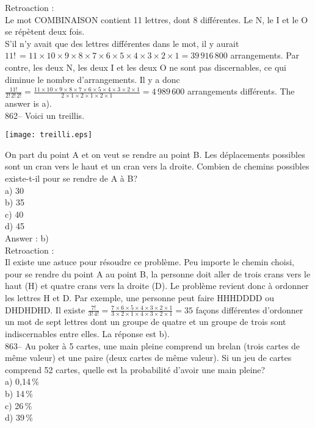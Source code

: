 ﻿\documentclass[letterpaper, 12pt]{article}
\begin{document}
Retroaction : \\
Le mot COMBINAISON contient 11 lettres, dont 8 diff\'erentes.  Le N, le I et
le O se r\'ep\`etent deux fois.\\
S'il n'y avait que des lettres diff\'erentes dans le mot, il y aurait
$11!\,=11\times10\times9\times8\times7\times6\times5\times4\times3\times2\times1=39\,916\,800$
arrangements.  Par contre, les deux N, les deux I et les deux O ne sont pas
discernables, ce qui diminue le nombre d'arrangements.  Il y a donc
$\frac{11!}{2!\,2!\,2!}=\frac{11\times10\times9\times8\times7\times6\times5\times4\times3\times2\times1}{2\times1\times2\times1\times2\times1}=4\,989\,600$
arrangements diff\'erents.  The answer is a).\\

862-- Voici un treillis.    \begin{center}
    \texttt{[image: treilli.eps]}
    \end{center}
On part du point A et on veut se rendre au point B.  Les d\'eplacements
possibles sont un cran vers le haut et un cran vers la droite.  Combien de
chemins possibles existe-t-il pour se rendre de A \`a B?\\
a) 30\\
b) 35\\
c) 40\\
d) 45\\

Answer : b)\\

Retroaction : \\
Il existe une astuce pour r\'esoudre ce probl\`eme. Peu importe le chemin
choisi, pour se rendre du point A au point B, la personne doit aller de
trois crans vers le haut (H) et quatre crans vers la droite (D).  Le
probl\`eme revient donc \`a ordonner les lettres H et D.  Par exemple, une
personne peut faire HHHDDDD ou DHDHDHD.  Il existe
$\frac{7!}{3!\,4!}=\frac{7\times6\times5\times4\times3\times2\times1}{3\times2\times1\times4\times3\times2\times1}=35$
fa\c cons diff\'erentes d'ordonner un mot de sept lettres dont un groupe de
quatre et un groupe de trois sont indiscernables entre elles. La r\'eponse
est b).\\

863-- Au poker \`a 5 cartes, une main pleine comprend un brelan (trois
cartes de m\^eme valeur) et une paire (deux cartes de m\^eme valeur).  Si un
jeu de cartes comprend 52 cartes, quelle est la probabilit\'e d'avoir une
main pleine?\\
a) 0,14\,\%\\
b) 14\,\%\\
c) 26\,\%\\
d) 39\,\%\\
\end{document}
